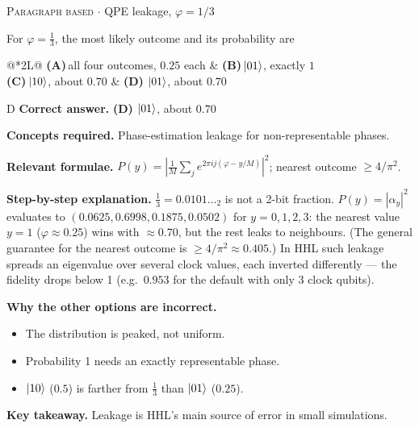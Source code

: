 \documentclass[11pt,a4paper]{article}
\newcommand{\optlabel}[1]{\textbf{(#1)}}
\newcommand{\correctlabel}[1]{\textcolor{okgreen}{\textbf{(#1)}\,\ding{51}}}
\newenvironment{qitem}[1]{\begin{list}{}{\setlength{\leftmargin}{3.3em}\setlength{\labelwidth}{3.1em}%
  \setlength{\labelsep}{0.2em}\setlength{\topsep}{3pt}\setlength{\parsep}{3pt}}\item[\textbf{Q.#1}\hfill]}{\end{list}}
\newcommand{\qsep}{\par\vspace{2pt}{\color{black!15}\hrule}\vspace{4pt}}
\newcommand{\qmeta}[2]{{\footnotesize\color{black!60}\textsc{#1} \;$\cdot$\; #2}\par}
\begin{document}
\begin{qitem}{38}
\qmeta{Paragraph based}{QPE leakage, $\varphi = 1/3$}
For $\varphi = \tfrac13$, the most likely outcome and its probability are
\par\smallskip\noindent\begin{tabularx}{\linewidth}{@{}*{2}{L}@{}}
\optlabel{A}\,all four outcomes, $0.25$ each & \optlabel{B}\,$\ket{01}$, exactly $1$ \\[3pt]
\optlabel{C}\,$\ket{10}$, about $0.70$ & \correctlabel{D}\,$\ket{01}$, about $0.70$
\end{tabularx}
\end{qitem}
\begin{solbox}{D}
\textbf{\color{brand}Correct answer.} \textcolor{okgreen}{\textbf{(D)}} $\ket{01}$, about $0.70$

\textbf{\color{brand}Concepts required.} Phase-estimation leakage for non-representable phases.

\textbf{\color{brand}Relevant formulae.} $P(y) = \left|\frac1M\sum_je^{2\pi ij(\varphi - y/M)}\right|^2$; nearest outcome $\ge 4/\pi^2$.

\textbf{\color{brand}Step-by-step explanation.} $\tfrac13 = 0.0101\dots_2$ is not a 2-bit fraction. $P(y) = |\alpha_y|^2$ evaluates to $(0.0625, 0.6998, 0.1875, 0.0502)$ for $y = 0, 1, 2, 3$: the nearest value $y = 1$ ($\varphi \approx 0.25$) wins with
$\approx 0.70$, but the rest leaks to neighbours. (The general guarantee for the nearest outcome is $\ge 4/\pi^2 \approx 0.405$.) In HHL such leakage spreads an eigenvalue
over several clock values, each inverted differently --- the fidelity drops below 1 (e.g.\ $0.953$ for the default with only 3 clock qubits).

\textbf{\color{brand}Why the other options are incorrect.}
\begin{itemize}[leftmargin=2.4em, itemsep=1pt, topsep=2pt]
\item[\textbf{(A)}] The distribution is peaked, not uniform.
\item[\textbf{(B)}] Probability 1 needs an exactly representable phase.
\item[\textbf{(C)}] $\ket{10}$ ($0.5$) is farther from $\frac13$ than $\ket{01}$ ($0.25$).
\end{itemize}
\textbf{\color{brand}Key takeaway.} Leakage is HHL's main source of error in small simulations.
\end{solbox}
\qsep
\end{document}
